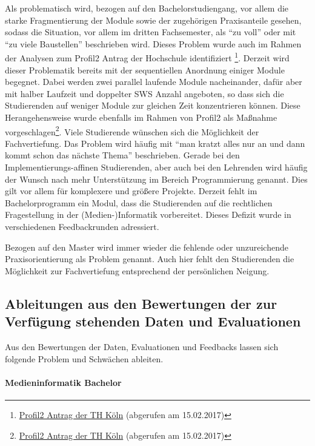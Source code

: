 Als problematisch wird, bezogen auf den Bachelorstudiengang, vor allem
die starke Fragmentierung der Module sowie der zugehörigen Praxisanteile
gesehen, sodass die Situation, vor allem im dritten Fachsemester, als
``zu voll'' oder mit ``zu viele Baustellen'' beschrieben wird. Dieses
Problem wurde auch im Rahmen der Analysen zum Profil2 Antrag der
Hochschule identifiziert \footnote{\href{https://www.th-koeln.de/mam/downloads/deutsch/hochschule/profil/lehre/profil2_antrag_ministerium.pdf}{Profil2
  Antrag der TH Köln} (abgerufen am 15.02.2017)}. Derzeit wird dieser
Problematik bereits mit der sequentiellen Anordnung einiger Module
begegnet. Dabei werden zwei parallel laufende Module nacheinander, dafür
aber mit halber Laufzeit und doppelter SWS Anzahl angeboten, so dass
sich die Studierenden auf weniger Module zur gleichen Zeit konzentrieren
können. Diese Herangehensweise wurde ebenfalls im Rahmen von Profil2 als
Maßnahme vorgeschlagen\footnote{\href{https://www.th-koeln.de/mam/downloads/deutsch/hochschule/profil/lehre/profil2_antrag_ministerium.pdf}{Profil2
  Antrag der TH Köln} (abgerufen am 15.02.2017)}. Viele Studierende
wünschen sich die Möglichkeit der Fachvertiefung. Das Problem wird
häufig mit ``man kratzt alles nur an und dann kommt schon das nächste
Thema'' beschrieben. Gerade bei den Implementierungs-affinen
Studierenden, aber auch bei den Lehrenden wird häufig der Wunsch nach
mehr Unterstützung im Bereich Programmierung genannt. Dies gilt vor
allem für komplexere und größere Projekte. Derzeit fehlt im
Bachelorprogramm ein Modul, dass die Studierenden auf die rechtlichen
Fragestellung in der (Medien-)Informatik vorbereitet. Dieses Defizit
wurde in verschiedenen Feedbackrunden adressiert.

Bezogen auf den Master wird immer wieder die fehlende oder unzureichende
Praxisorientierung als Problem genannt. Auch hier fehlt den Studierenden
die Möglichkeit zur Fachvertiefung entsprechend der persönlichen
Neigung.

\subsection{Ableitungen aus den Bewertungen der zur Verfügung
stehenden Daten und
Evaluationen}\label{ableitungen-aus-den-bewertungen-der-zur-verfuxfcgung-stehenden-daten-und-evaluationen}

Aus den Bewertungen der Daten, Evaluationen und Feedbacks lassen sich
folgende Problem und Schwächen ableiten.

\paragraph{Medieninformatik Bachelor}\label{medieninformatik-bachelor}

